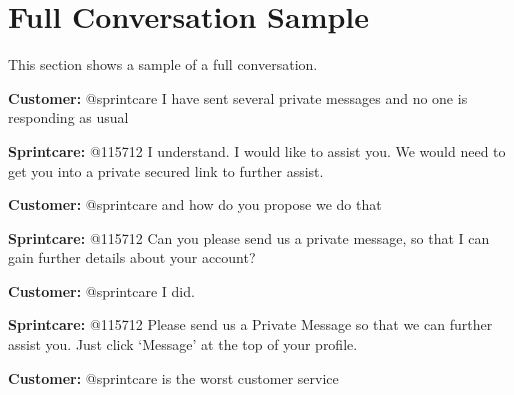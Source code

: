 \documentclass[11pt]{article}
\begin{document}
\section{Full Conversation Sample}
\label{Full-Conversation-Sample-twitter}
This section shows a sample of a full conversation.

\textbf{Customer:} @sprintcare I have sent several private messages and no one is responding as usual

\textbf{Sprintcare:} @115712 I understand. I would like to assist you. We would need to get you into a private secured link to further assist.

\textbf{Customer:} @sprintcare and how do you propose we do that

\textbf{Sprintcare:} @115712 Can you please send us a private message, so that I can gain further details about your account?

\textbf{Customer:} @sprintcare I did.

\textbf{Sprintcare:} @115712 Please send us a Private Message so that we can further assist you. Just click ‘Message’ at the top of your profile.

\textbf{Customer:} @sprintcare is the worst customer service
\end{document}
